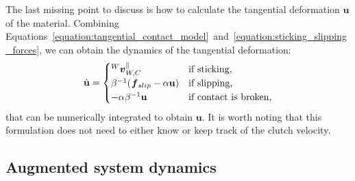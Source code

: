 The last missing point to discuss is how to calculate the tangential deformation $\mathbf{u}$ of the material.
Combining Equations~\eqref{equation:tangential_contact_model}~and~\eqref{equation:sticking_slipping_forces}, we can obtain the dynamics of the tangential deformation:
%
\begin{equation}
    \label{equation:tangential_deformation_dynamics}
    \dot{\mathbf{u}} =
    \begin{cases}
        \vellin[W]^{\parallel}_{W,C} &\text{if sticking,} \\
        \beta^{-1} (\forcelin_{slip} - \alpha \mathbf{u}) &\text{if slipping,} \\
        -\alpha \beta^{-1} \mathbf{u} &\text{if contact is broken,}
    \end{cases}
\end{equation}
%
that can be numerically integrated to obtain $\mathbf{u}$.
It is worth noting that this formulation does not need to either know or keep track of the clutch velocity.

\subsection{Augmented system dynamics}

